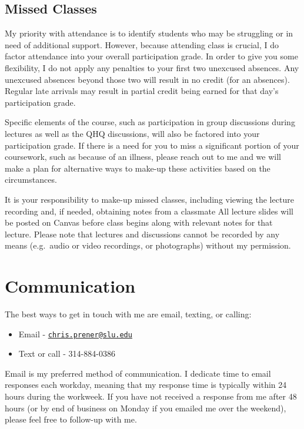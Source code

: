 \documentclass[
]{book}
\providecommand{\tightlist}{%
  \setlength{\itemsep}{0pt}\setlength{\parskip}{0pt}}
\begin{document}
\hypertarget{missed-classes}{%
\subsection{Missed Classes}\label{missed-classes}}

My priority with attendance is to identify students who may be struggling or in need of additional support. However, because attending class is crucial, I do factor attendance into your overall participation grade. In order to give you some flexibility, I do not apply any penalties to your first two unexcused absences. Any unexcused absences beyond those two will result in no credit (for an absences). Regular late arrivals may result in partial credit being earned for that day's participation grade.

Specific elements of the course, such as participation in group discussions during lectures as well as the QHQ discussions, will also be factored into your participation grade. If there is a need for you to miss a significant portion of your coursework, such as because of an illness, please reach out to me and we will make a plan for alternative ways to make-up these activities based on the circumstances.

It is your responsibility to make-up missed classes, including viewing the lecture recording and, if needed, obtaining notes from a classmate All lecture slides will be posted on Canvas before class begins along with relevant notes for that lecture. Please note that lectures and discussions cannot be recorded by any means (e.g.~audio or video recordings, or photographs) without my permission.

\hypertarget{communication}{%
\section{Communication}\label{communication}}

The best ways to get in touch with me are email, texting, or calling:

\begin{itemize}
\tightlist
\item
  Email - \href{mailto:chris.prener@slu.edu}{\nolinkurl{chris.prener@slu.edu}}
\item
  Text or call - 314-884-0386
\end{itemize}

Email is my preferred method of communication. I dedicate time to email responses each workday, meaning that my response time is typically within 24 hours during the workweek. If you have not received a response from me after 48 hours (or by end of business on Monday if you emailed me over the weekend), please feel free to follow-up with me.
\end{document}
